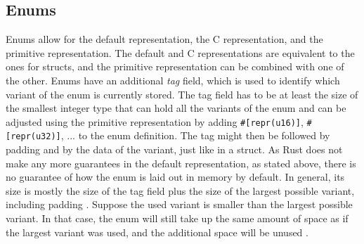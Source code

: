 \subsection{Enums}
Enums allow for the default representation, the C representation, and the primitive representation.
The default and C representations are equivalent to the ones for structs, and the primitive representation can be combined with one of the other.
Enums have an additional \textit{tag} field, which is used to identify which variant of the enum is currently stored.
The tag field has to be at least the size of the smallest integer type that can hold all the variants of the enum and can be adjusted using the primitive representation by adding \texttt{\#[repr(u16)]}, \texttt{\#[repr(u32)]}, ... to the enum definition.
The tag might then be followed by padding and by the data of the variant, just like in a struct.
As Rust does not make any more guarantees in the default representation, as stated above, there is no guarantee of how the enum is laid out in memory by default.
In general, its size is mostly the size of the tag field plus the size of the largest possible variant, including padding \cite[233-234]{Blandy_Jim2021-07-20}.
Suppose the used variant is smaller than the largest possible variant. In that case, the enum will still take up the same amount of space as if the largest variant was used, and the additional space will be unused \cite[3.3 Enums]{rustunsafe} \cite[Chapter~10.3]{rustref}.
